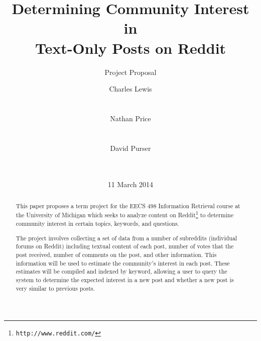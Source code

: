 \documentclass{acm_proc_article-sp}
\begin{document}
\title{Determining Community Interest in\\Text-Only Posts on Reddit}
\subtitle{Project Proposal}

%
%
%


\author{
%
%
\alignauthor
Charles Lewis\\
       \\
       \\
\alignauthor
Nathan Price\\
       \\
       \\
\alignauthor
David Purser\\
       \\
       \\
}

\date{11 March 2014}

\maketitle
\begin{abstract}
This paper proposes a term project for the EECS 498 Information Retrieval
course at the University of Michigan which seeks to analyze content on 
Reddit\footnote{\texttt{http://www.reddit.com/}} to determine community
interest in certain topics, keywords, and questions.

The project involves collecting a set of data from a number of subreddits
(individual forums on Reddit) including textual content of each post,
number of votes that the post received, number of comments on the post, and
other information.  This information will be used to estimate the community's
interest in each post.  These estimates will be compiled and indexed by keyword,
allowing a user to query the system to determine the expected interest in a
new post and whether a new post is very similar to previous posts.
\end{abstract}
\end{document}
